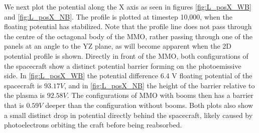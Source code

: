 We next plot the potential along the X axis as seen in figures \ref{fig:L_posX_WB} and \ref{fig:L_posX_NB}. The profile is plotted at timestep 10,000, when the floating potential has stabilized. Note that the profile line does not pass through the centre of the octagonal body of the MMO, rather passing through one of the panels at an angle to the YZ plane, as will become apparent when the 2D potential profile is shown. Directly in front of the MMO, both configurations of the spacecraft show a distinct potential barrier forming on the photoemissive side. In \ref{fig:L_posX_WB} the potential difference 6.4 V floating potential of the spacecraft is $93.17 V$, and in \ref{fig:L_posX_NB} the height of the barrier relative to the plasma is $92.58 V$. The configurations of MMO with booms then has a barrier that is $0.59 V$ deeper than the configuration without booms. Both plots also show a small distinct drop in potential directly behind the spacecraft, likely caused by photoelectrons orbiting the craft before being reabsorbed.    




